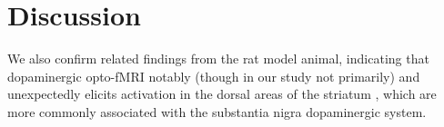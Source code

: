 \section{Discussion}

We also confirm related findings from the rat model animal, indicating that dopaminergic opto-fMRI notably (though in our study not primarily) and unexpectedly elicits activation in the dorsal areas of the striatum \cite{Lohani2016}, which are more commonly associated with the substantia nigra dopaminergic system.
